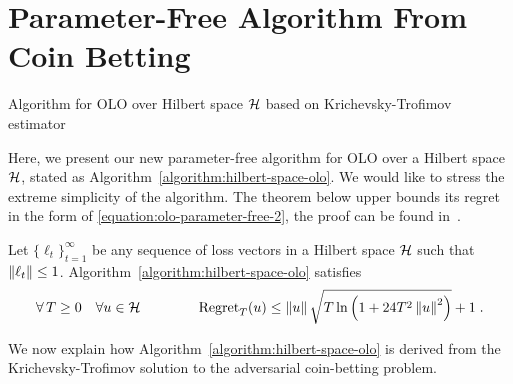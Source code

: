 \section{Parameter-Free Algorithm From Coin Betting}
\label{section:algorithms}

\begin{algorithm}[t]
\caption{Algorithm for OLO over Hilbert space $\mathcal{H}$ based on Krichevsky-Trofimov estimator
\label{algorithm:hilbert-space-olo}}
\begin{algorithmic}[1]
{
\ENDFOR
}
\end{algorithmic}
\end{algorithm}

Here, we present our new parameter-free algorithm for \ac{OLO} over a Hilbert
space $\mathcal{H}$,  stated as Algorithm~\ref{algorithm:hilbert-space-olo}.  We would
like to stress the extreme simplicity of the algorithm. The theorem below upper
bounds its regret in the form of \eqref{equation:olo-parameter-free-2}, the
proof can be found in~\cite{Orabona-Pal-2016-parameter-free}.

\begin{theorem}
\label{theorem:hilbert-space-olo-regret}
Let $\{\ell_t\}_{t=1}^\infty$ be any sequence of loss vectors
in a Hilbert space $\mathcal{H}$ such that $\left\|{\ell_t}\right\| \le 1$.
Algorithm~\ref{algorithm:hilbert-space-olo} satisfies
$$
\forall \, T \ge 0 \quad
\forall u \in \mathcal{H} \qquad \qquad
\operatorname{Regret}_T(u) \le \left\|{u}\right\| \sqrt{T \ln\left(1 + 24T^2 \left\|{u}\right\|^2 \right)} + 1 \;.
$$
\end{theorem}

We now explain how Algorithm~\ref{algorithm:hilbert-space-olo} is derived from the
Krichevsky-Trofimov solution to the adversarial coin-betting problem.

